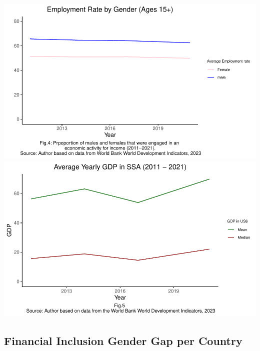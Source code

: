 \documentclass[preprint, 3p,
authoryear]{elsarticle} %
\begin{document}
\includegraphics{504.Project1_files/figure-latex/unnamed-chunk-3-4.pdf}
\includegraphics{504.Project1_files/figure-latex/unnamed-chunk-3-5.pdf}

\hypertarget{financial-inclusion-gender-gap-per-country}{%
\subsection{Financial Inclusion Gender Gap per
Country}\label{financial-inclusion-gender-gap-per-country}}
\end{document}
